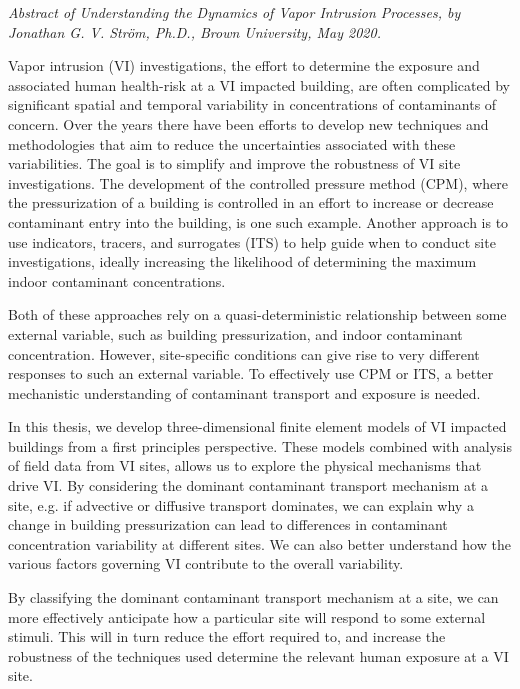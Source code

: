 \newpage
\textit{Abstract of Understanding the Dynamics of Vapor Intrusion Processes, by Jonathan G. V. Ström, Ph.D., Brown University, May 2020.}

Vapor intrusion (VI) investigations, the effort to determine the exposure and associated human health-risk at a VI impacted building, are often complicated by significant spatial and temporal variability in concentrations of contaminants of concern.
Over the years there have been efforts to develop new techniques and methodologies that aim to reduce the uncertainties associated with these variabilities.
The goal is to simplify and improve the robustness of VI site investigations.
The development of the controlled pressure method (CPM), where the pressurization of a building is controlled in an effort to increase or decrease contaminant entry into the building, is one such example.
Another approach is to use indicators, tracers, and surrogates (ITS) to help guide when to conduct site investigations, ideally increasing the likelihood of determining the maximum indoor contaminant concentrations.\par

Both of these approaches rely on a quasi-deterministic relationship between some external variable, such as building pressurization, and indoor contaminant concentration.
However, site-specific conditions can give rise to very different responses to such an external variable.
To effectively use CPM or ITS, a better mechanistic understanding of contaminant transport and exposure is needed.\par

In this thesis, we develop three-dimensional finite element models of VI impacted buildings from a first principles perspective.
These models combined with analysis of field data from VI sites, allows us to explore the physical mechanisms that drive VI.
By considering the dominant contaminant transport mechanism at a site, e.g. if advective or diffusive transport dominates, we can explain why a change in building pressurization can lead to differences in contaminant concentration variability at different sites.
We can also better understand how the various factors governing VI contribute to the overall variability.\par

By classifying the dominant contaminant transport mechanism at a site, we can more effectively anticipate how a particular site will respond to some external stimuli.
This will in turn reduce the effort required to, and increase the robustness of the techniques used determine the relevant human exposure at a VI site.\par

